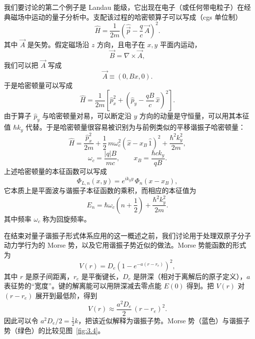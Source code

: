 我们要讨论的第二个例子是 Landau 能级，它出现在电子（或任何带电粒子）在经典磁场中运动的量子分析中。支配该过程的哈密顿算子可以写成（cgs 单位制）
\begin{equation}
\hat H=\frac{1}{2m}\left(\hat{\vec p}-\frac{q}{c}\,\vec A\right)^2.
\label{eq:3.5.8}
\end{equation}
其中 $\vec A$ 是矢势。假定磁场沿 $z$ 方向，且电子在 $x,y$ 平面内运动，
\begin{equation}
\vec B=\nabla\times\vec A,
\label{eq:3.5.9}
\end{equation}
我们可以把 $\vec A$ 写成
\begin{equation}
\vec A\equiv(0,Bx,0).
\label{eq:3.5.10}
\end{equation}
于是哈密顿量可以写成
\begin{equation}
\hat H=\frac{1}{2m}\left[\hat p_x^2
+\left(\hat p_y-\frac{qB}{c}\,\hat x\right)^2\right].
\label{eq:3.5.11}
\end{equation}
由于算子 $\hat p_y$ 与哈密顿量对易，可以断定沿 $y$ 方向的动量是守恒量，可以用其本征值 $\hbar k_y$ 代替。于是哈密顿量很容易被识别为与前例类似的平移谐振子哈密顿量：
\[
\hat H=\frac{\hat p_x^2}{2m}
+\frac{1}{2}\,m\omega_c^2
\left(\hat x-x_B\,\hat 1\right)^2
+\frac{\hbar^2 k_y^2}{2m},
\]
\begin{equation}
\omega_c=\frac{|q|B}{mc},\qquad x_B=\frac{\hbar c k_y}{qB}.
\label{eq:3.5.12}
\end{equation}
上述哈密顿量的本征函数可以写成
\begin{equation}
\Phi_{L,n}(x,y)=e^{ik_y y}\,\Phi_n(x-x_B),
\label{eq:3.5.13}
\end{equation}
它本质上是平面波与谐振子本征函数的乘积，而相应的本征值为
\begin{equation}
E_n=\hbar\omega_c\!\left(n+\frac{1}{2}\right)
+\frac{\hbar^2 k_y^2}{2m}.
\label{eq:3.5.14}
\end{equation}
其中频率 $\omega_c$ 称为回旋频率。

在结束对量子谐振子形式体系应用的这一概述之前，我们讨论用于处理双原子分子动力学行为的 Morse 势，以及它用谐振子势近似的做法。Morse 势能函数的形式为
\begin{equation}
V(r)=D_e\!\left(1-e^{-a(r-r_e)}\right)^2,
\label{eq:3.5.15}
\end{equation}
其中 $r$ 是原子间距离，$r_e$ 是平衡键长，$D_e$ 是阱深（相对于离解后的原子定义），$a$ 表征势的``宽度''。键的解离能可以用阱深减去零点能 $E(0)$ 得到。把 $V(r)$ 对 $(r-r_e)$ 展开到最低阶，得到
\begin{equation}
V(r)\approx\frac{a^2D_e}{2}\,(r-r_e)^2.
\label{eq:3.5.16}
\end{equation}
因此可以令 $a^2D_e/2=\frac{1}{2}k$，把该近似解释为谐振子势。Morse 势（蓝色）与谐振子势（绿色）的比较见图~\ref{fig:3.4}。

